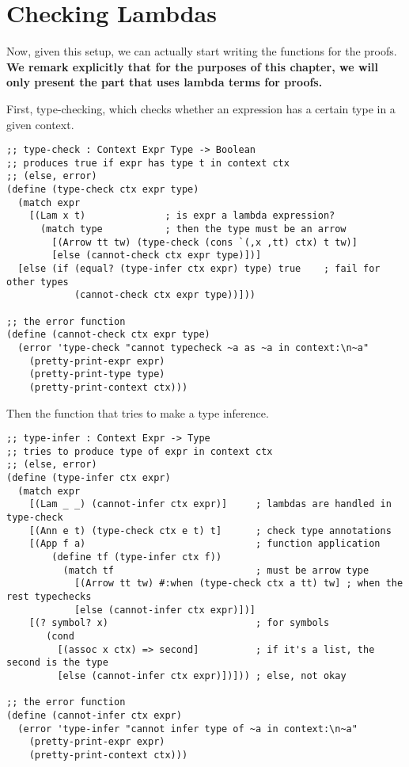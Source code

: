 \section{Checking Lambdas}

Now, given this setup, we can actually start writing the functions
for the proofs. \textbf{We remark explicitly that for the purposes %
  of this chapter, we will only present the part that uses lambda terms
  for proofs.}

First, type-checking, which checks whether an
expression has a certain type in a given context.
{
  \small
\begin{verbatim}
;; type-check : Context Expr Type -> Boolean
;; produces true if expr has type t in context ctx
;; (else, error)
(define (type-check ctx expr type)
  (match expr
    [(Lam x t)              ; is expr a lambda expression?
      (match type           ; then the type must be an arrow
        [(Arrow tt tw) (type-check (cons `(,x ,tt) ctx) t tw)]
        [else (cannot-check ctx expr type)])]
  [else (if (equal? (type-infer ctx expr) type) true    ; fail for other types
            (cannot-check ctx expr type))]))

;; the error function
(define (cannot-check ctx expr type)
  (error 'type-check "cannot typecheck ~a as ~a in context:\n~a"
    (pretty-print-expr expr)
    (pretty-print-type type)
    (pretty-print-context ctx)))
\end{verbatim}
}

Then the function that tries to make a type inference.
{
  \small
\begin{verbatim}
;; type-infer : Context Expr -> Type
;; tries to produce type of expr in context ctx
;; (else, error)
(define (type-infer ctx expr)
  (match expr
    [(Lam _ _) (cannot-infer ctx expr)]     ; lambdas are handled in type-check
    [(Ann e t) (type-check ctx e t) t]      ; check type annotations
    [(App f a)                              ; function application
        (define tf (type-infer ctx f))
          (match tf                         ; must be arrow type
            [(Arrow tt tw) #:when (type-check ctx a tt) tw] ; when the rest typechecks
            [else (cannot-infer ctx expr)])]
    [(? symbol? x)                          ; for symbols
       (cond
         [(assoc x ctx) => second]          ; if it's a list, the second is the type
         [else (cannot-infer ctx expr)])])) ; else, not okay

;; the error function
(define (cannot-infer ctx expr)
  (error 'type-infer "cannot infer type of ~a in context:\n~a"
    (pretty-print-expr expr)
    (pretty-print-context ctx)))
\end{verbatim}
}

